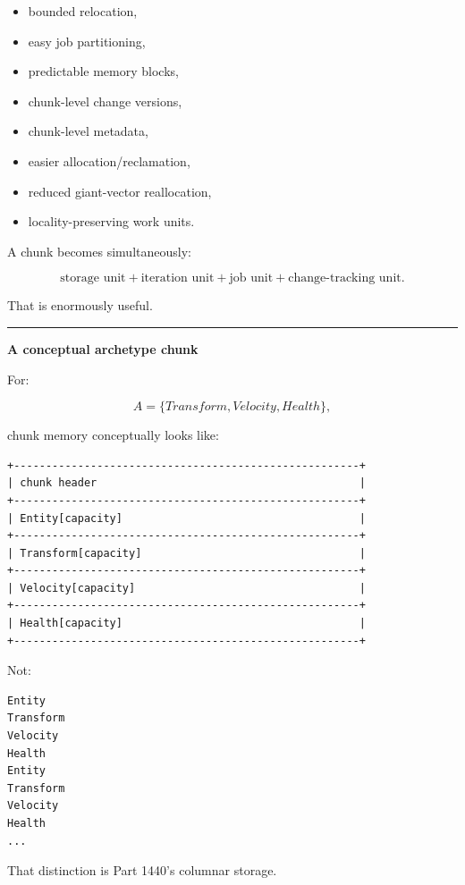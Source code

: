\begin{itemize}
\tightlist
\item
  bounded relocation,
\item
  easy job partitioning,
\item
  predictable memory blocks,
\item
  chunk-level change versions,
\item
  chunk-level metadata,
\item
  easier allocation/reclamation,
\item
  reduced giant-vector reallocation,
\item
  locality-preserving work units.
\end{itemize}

A chunk becomes simultaneously:

\[
\boxed{
\text{storage unit}
+
\text{iteration unit}
+
\text{job unit}
+
\text{change-tracking unit}.
}
\]

That is enormously useful.

\begin{center}\rule{0.5\linewidth}{0.5pt}\end{center}

\textbf{A conceptual archetype chunk}

For:

\[
A=\{Transform,Velocity,Health\},
\]

chunk memory conceptually looks like:

\begin{verbatim}
+------------------------------------------------------+
| chunk header                                         |
+------------------------------------------------------+
| Entity[capacity]                                     |
+------------------------------------------------------+
| Transform[capacity]                                  |
+------------------------------------------------------+
| Velocity[capacity]                                   |
+------------------------------------------------------+
| Health[capacity]                                     |
+------------------------------------------------------+
\end{verbatim}

Not:

\begin{verbatim}
Entity
Transform
Velocity
Health
Entity
Transform
Velocity
Health
...
\end{verbatim}

That distinction is Part 1440's columnar storage.

